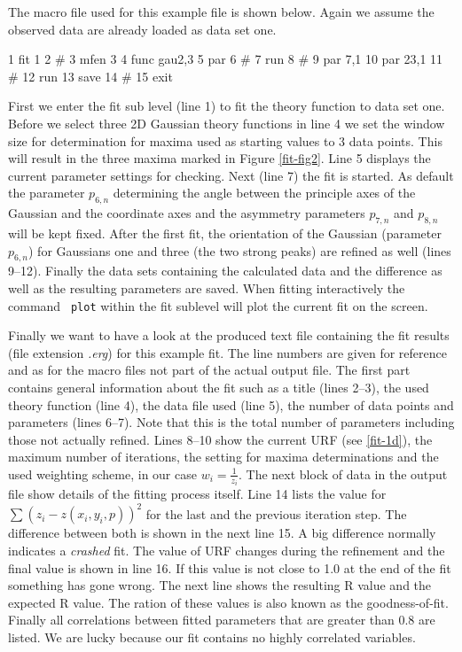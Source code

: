 The macro file used for this example file is shown below. Again we
assume the observed data are already loaded as data set one.

\begin{MacVerbatim}
     1  fit 1
     2  #
     3  mfen 3
     4  func gau2,3
     5  par
     6  #
     7  run
     8  #
     9  par  7,1
    10  par 23,1
    11  #
    12  run
    13  save
    14  #
    15  exit
\end{MacVerbatim}

First we enter the fit sub level (line 1) to fit the theory function
to data set one. Before we select three 2D Gaussian theory functions
in line 4 we set the window size for determination for maxima used
as starting values to 3 data points. This will result in the three
maxima marked in Figure \ref{fit-fig2}. Line 5 displays the current
parameter settings for checking. Next (line 7) the fit is started.
As default the parameter $p_{6,n}$ determining the angle between the
principle axes of the Gaussian and the coordinate axes and the
asymmetry parameters $p_{7,n}$ and $p_{8,n}$ will be kept fixed.
After the first fit, the orientation of the Gaussian (parameter
$p_{6,n}$) for Gaussians one and three (the two strong peaks) are
refined as well (lines 9--12). Finally the data sets containing the
calculated data and the difference as well as the resulting
parameters are saved. When fitting interactively the command {\tt
plot} within the fit sublevel will plot the current fit on the
screen.
\par

Finally we want to have a look at the produced text file containing
the fit results (file extension {\it .erg}) for this example fit.
The line numbers are given for reference and as for the macro files
not part of the actual output file.  The first part contains general
information about the fit such as a title (lines 2--3), the used
theory function (line 4), the data file used (line 5), the number of
data points and parameters (lines 6--7).  Note that this is the
total number of parameters including those not actually refined.
Lines 8--10 show the current URF (see \ref{fit-1d}), the maximum
number of iterations, the setting for maxima determinations and the
used weighting scheme, in our case $w_{i} = \frac{1}{z_{i}}$.  The
next block of data in the output file show details of the fitting
process itself. Line 14 lists the value for $\sum (z_{i} -
z(x_{i},y_{i},p))^{2}$ for the last and the previous iteration step.
The difference between both is shown in the next line 15.  A big
difference normally indicates a {\it crashed} fit. The value of URF
changes during the refinement and the final value is shown in line
16.  If this value is not close to 1.0 at the end of the fit
something has gone wrong.  The next line shows the resulting R value
and the expected R value.  The ration of these values is also known
as the goodness-of-fit.  Finally all correlations between fitted
parameters that are greater than 0.8 are listed.  We are lucky
because our fit contains no highly correlated variables.

